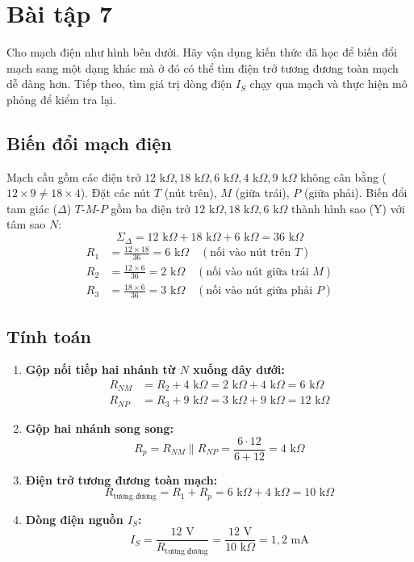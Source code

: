 \section{Bài tập 7}

Cho mạch điện như hình bên dưới. Hãy vận dụng kiến thức đã học để biến đổi mạch sang một dạng khác mà ở đó có thể tìm điện trở tương đương toàn mạch dễ dàng hơn. Tiếp theo, tìm giá trị dòng điện $I_S$ chạy qua mạch và thực hiện mô phỏng để kiểm tra lại.


\subsection{Biến đổi mạch điện}
\noindent Mạch cầu gồm các điện trở $12\text{ k}\Omega, 18\text{ k}\Omega, 6\text{ k}\Omega, 4\text{ k}\Omega, 9\text{ k}\Omega$ không cân bằng ($12 \times 9 \neq 18 \times 4$). Đặt các nút $T$ (nút trên), $M$ (giữa trái), $P$ (giữa phải). Biến đổi tam giác ($\Delta$) $T$-$M$-$P$ gồm ba điện trở $12\text{ k}\Omega, 18\text{ k}\Omega, 6\text{ k}\Omega$ thành hình sao (Y) với tâm sao $N$:
\[
\Sigma_\Delta = 12\text{ k}\Omega + 18\text{ k}\Omega + 6\text{ k}\Omega = 36\text{ k}\Omega
\]
\begin{align*}
R_1 &= \frac{12 \times 18}{36} = 6\text{ k}\Omega \quad (\text{nối vào nút trên } T) \\
R_2 &= \frac{12 \times 6}{36} = 2\text{ k}\Omega \quad (\text{nối vào nút giữa trái } M) \\
R_3 &= \frac{18 \times 6}{36} = 3\text{ k}\Omega \quad (\text{nối vào nút giữa phải } P)
\end{align*}

\subsection{Tính toán}
\begin{enumerate}[leftmargin=2em]
  \item \textbf{Gộp nối tiếp hai nhánh từ $N$ xuống dây dưới:}
        \begin{align*}
        R_{NM} &= R_2 + 4\text{ k}\Omega = 2\text{ k}\Omega + 4\text{ k}\Omega = 6\text{ k}\Omega \\
        R_{NP} &= R_3 + 9\text{ k}\Omega = 3\text{ k}\Omega + 9\text{ k}\Omega = 12\text{ k}\Omega
        \end{align*}
  \item \textbf{Gộp hai nhánh song song:}
        \[
        R_p = R_{NM} \parallel R_{NP} = \frac{6 \cdot 12}{6 + 12} = 4\text{ k}\Omega
        \]
  \item \textbf{Điện trở tương đương toàn mạch:}
        \[
        R_{\text{tương đương}} = R_1 + R_p = 6\text{ k}\Omega + 4\text{ k}\Omega = 10\text{ k}\Omega
        \]
  \item \textbf{Dòng điện nguồn $I_S$:}
        \[
        I_S = \frac{12\text{ V}}{R_{\text{tương đương}}} = \frac{12\text{ V}}{10\text{ k}\Omega} = 1{,}2\text{ mA}
        \]
\end{enumerate}

